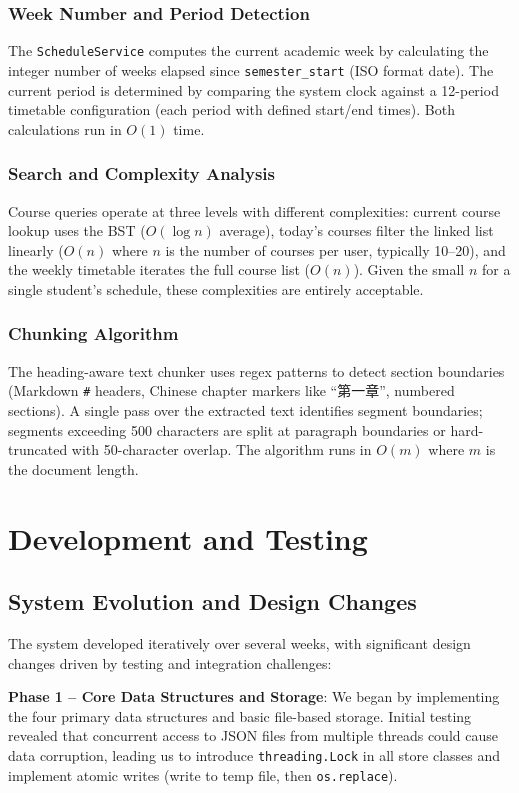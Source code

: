\documentclass[11pt,a4paper]{article}
\begin{document}
\subsubsection{Week Number and Period Detection}
The \texttt{ScheduleService} computes the current academic week by calculating the integer number of weeks elapsed since \texttt{semester\_start} (ISO format date). The current period is determined by comparing the system clock against a 12-period timetable configuration (each period with defined start/end times). Both calculations run in $O(1)$ time.

\subsubsection{Search and Complexity Analysis}
Course queries operate at three levels with different complexities: current course lookup uses the BST ($O(\log n)$ average), today's courses filter the linked list linearly ($O(n)$ where $n$ is the number of courses per user, typically 10--20), and the weekly timetable iterates the full course list ($O(n)$). Given the small $n$ for a single student's schedule, these complexities are entirely acceptable.

\subsubsection{Chunking Algorithm}
The heading-aware text chunker uses regex patterns to detect section boundaries (Markdown \texttt{\#} headers, Chinese chapter markers like ``第一章'', numbered sections). A single pass over the extracted text identifies segment boundaries; segments exceeding 500 characters are split at paragraph boundaries or hard-truncated with 50-character overlap. The algorithm runs in $O(m)$ where $m$ is the document length.

\section{Development and Testing}

\subsection{System Evolution and Design Changes}
The system developed iteratively over several weeks, with significant design changes driven by testing and integration challenges:

\textbf{Phase 1 -- Core Data Structures and Storage}: We began by implementing the four primary data structures and basic file-based storage. Initial testing revealed that concurrent access to JSON files from multiple threads could cause data corruption, leading us to introduce \texttt{threading.Lock} in all store classes and implement atomic writes (write to temp file, then \texttt{os.replace}).
\end{document}
